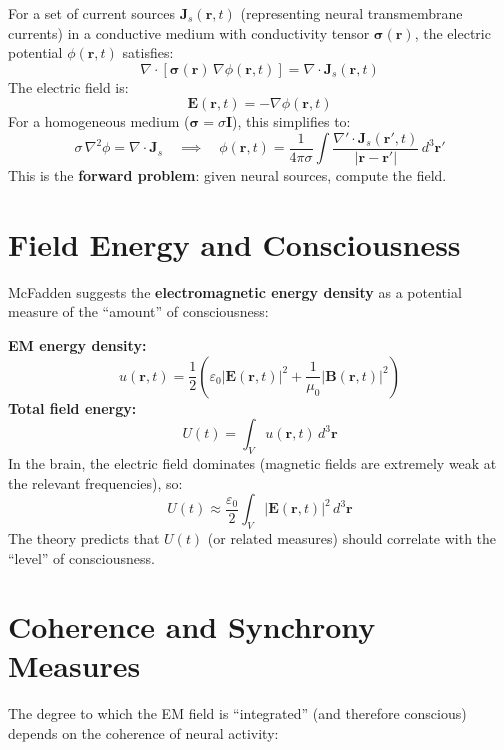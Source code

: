 \documentclass[11pt,a4paper]{report}
\begin{document}
\begin{mathbox}
\vspace{-6pt}
For a set of current sources $\mathbf{J}_s(\mathbf{r}, t)$ (representing neural transmembrane currents) in a conductive medium with conductivity tensor $\boldsymbol{\sigma}(\mathbf{r})$, the electric potential $\phi(\mathbf{r}, t)$ satisfies:
\[
  \nabla \cdot \left[\boldsymbol{\sigma}(\mathbf{r})\, \nabla\phi(\mathbf{r}, t)\right] = \nabla \cdot \mathbf{J}_s(\mathbf{r}, t)
\]
The electric field is:
\[
  \mathbf{E}(\mathbf{r}, t) = -\nabla\phi(\mathbf{r}, t)
\]
For a homogeneous medium ($\boldsymbol{\sigma} = \sigma \mathbf{I}$), this simplifies to:
\[
  \sigma\, \nabla^2\phi = \nabla \cdot \mathbf{J}_s \quad\implies\quad \phi(\mathbf{r}, t) = \frac{1}{4\pi\sigma}\int \frac{\nabla' \cdot \mathbf{J}_s(\mathbf{r}', t)}{|\mathbf{r} - \mathbf{r}'|}\, d^3\mathbf{r}'
\]
This is the \textbf{forward problem}: given neural sources, compute the field.
\vspace{-4pt}
\end{mathbox}

\section{Field Energy and Consciousness}

McFadden suggests the \textbf{electromagnetic energy density} as a potential measure of the ``amount'' of consciousness:

\begin{mathbox}
\vspace{-6pt}
\textbf{EM energy density:}
\[
  u(\mathbf{r}, t) = \frac{1}{2}\left(\varepsilon_0 |\mathbf{E}(\mathbf{r}, t)|^2 + \frac{1}{\mu_0}|\mathbf{B}(\mathbf{r}, t)|^2\right)
\]
\textbf{Total field energy:}
\[
  U(t) = \int_V u(\mathbf{r}, t)\, d^3\mathbf{r}
\]
In the brain, the electric field dominates (magnetic fields are extremely weak at the relevant frequencies), so:
\[
  U(t) \approx \frac{\varepsilon_0}{2} \int_V |\mathbf{E}(\mathbf{r}, t)|^2\, d^3\mathbf{r}
\]
The theory predicts that $U(t)$ (or related measures) should correlate with the ``level'' of consciousness.
\vspace{-4pt}
\end{mathbox}

\section{Coherence and Synchrony Measures}

The degree to which the EM field is ``integrated'' (and therefore conscious) depends on the coherence of neural activity:
\end{document}
